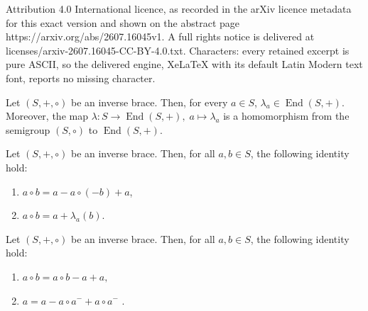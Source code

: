 \documentclass[10pt,a4paper]{amsart}
\DeclareMathOperator{\End}{End}
\begin{document}
Attribution 4.0 International licence, as recorded in the arXiv licence metadata for this exact version and shown on the abstract page https://arxiv.org/abs/2607.16045v1. A full rights notice is delivered at licenses/arxiv-2607.16045-CC-BY-4.0.txt. Characters: every retained excerpt is pure ASCII, so the delivered engine, XeLaTeX with its default Latin Modern text font, reports no missing character.
\begin{lemma}\label{key2.4}
Let $(S,+,\circ)$ be an inverse brace. Then, for every $a\in S$, $\lambda_a \in \End(S,+)$. Moreover, the map $\lambda: S \rightarrow \End(S,+),\; a \mapsto \lambda_a$ is a homomorphism from the semigroup $(S,\circ)$ to $\End(S,+)$.
\end{lemma}

\begin{lemma}\label{lemma_ab}
Let $(S,+,\circ)$ be an inverse brace. Then, for all $a,b\in S$, the following identity hold:
\begin{enumerate}
\item[\rm{(1)}] $a\circ b= a - a\circ (-b)+a$,
\item[\rm{(2)}] $a\circ b = a+\lambda_a(b)$.
\end{enumerate}
\end{lemma}

\begin{lemma}\label{lemma_1}
    Let $(S,+,\circ)$ be an inverse brace. Then, for all $a,b\in S$, the following identity hold: 
\begin{enumerate}
\item[\rm{(1)}] $a\circ b = a\circ b -a+a,$
\item[\rm{(2)}] $a= a -a \circ a^-+a\circ a^-$ .
\end{enumerate}
\end{lemma}  
\end{document}
